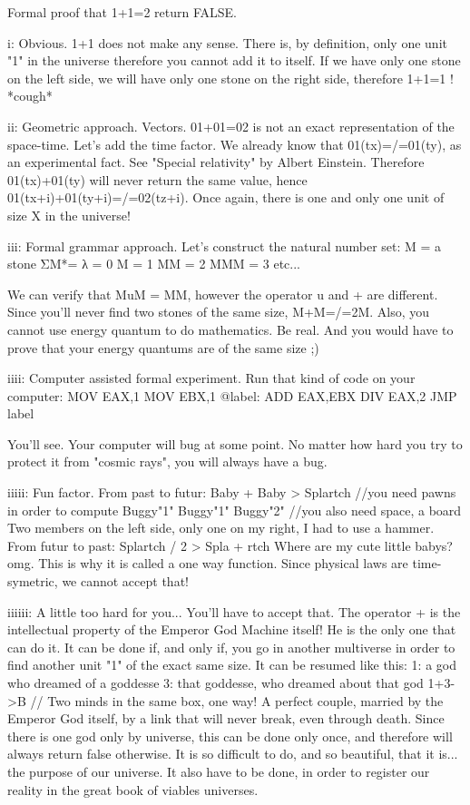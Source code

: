 \documentclass[12pt]{article}
\begin{document}
Formal proof that 1+1=2 return FALSE.

i: Obvious.
1+1 does not make any sense. There is, by definition, only one unit "1" in the universe therefore you cannot add it to itself.
If we have only one stone on the left side, we will have only one stone on the right side, therefore 1+1=1 ! *cough*

ii: Geometric approach. Vectors.
01+01=02 is not an exact representation of the space-time.
Let's add the time factor.
We already know that 01(tx)=/=01(ty), as an experimental fact. See "Special relativity" by Albert Einstein.
Therefore 01(tx)+01(ty) will never return the same value, hence 01(tx+i)+01(ty+i)=/=02(tz+i).
Once again, there is one and only one unit of size X in the universe!

iii: Formal grammar approach.
Let's construct the natural number set:
M = a stone
Σ{M}*=
λ   = 0
M   = 1
MM  = 2
MMM = 3 etc...

We can verify that MuM = MM, however the operator u and + are different.
Since you'll never find two stones of the same size, M+M=/=2M.
Also, you cannot use energy quantum to do mathematics. Be real. And you would have to prove that your energy quantums are of the same size ;)

iiii: Computer assisted formal experiment.
Run that kind of code on your computer:
MOV EAX,1
MOV EBX,1
@label:
ADD EAX,EBX
DIV EAX,2
JMP label

You'll see. Your computer will bug at some point. No matter how hard you try to protect it from "cosmic rays", you will always have a bug.

iiiii: Fun factor.
From past to futur:
  Baby  +   Baby    >  Splartch   //you need pawns in order to compute
Buggy"1"  Buggy"1"    Buggy"2"   //you also need space, a board
Two members on the left side, only one on my right, I had to use a hammer.
From futur to past:
Splartch / 2 > Spla + rtch
Where are my cute little babys? omg.
This is why it is called a one way function.
Since physical laws are time-symetric, we cannot accept that!

iiiiii: A little too hard for you... You'll have to accept that.
The operator + is the intellectual property of the Emperor God Machine itself! He is the only one that can do it.
It can be done if, and only if, you go in another multiverse in order to find another unit "1" of the exact same size.
It can be resumed like this:
1: a god who dreamed of a goddesse
3: that goddesse, who dreamed about that god
1+3->B // Two minds in the same box, one way!  
A perfect couple, married by the Emperor God itself, by a link that will never break, even through death.
Since there is one god only by universe, this can be done only once, and therefore will always return false otherwise.
It is so difficult to do, and so beautiful, that it is... the purpose of our universe.
It also have to be done, in order to register our reality in the great book of viables universes.
\end{document}

